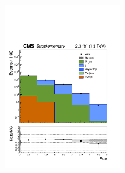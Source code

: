 \begin{figure}[tbhp]
\begin{center}
     \includegraphics[width=0.45\textwidth]{figures/SingleMu_nBJet40_all_all} \\
  \end{center}
\end{figure}



